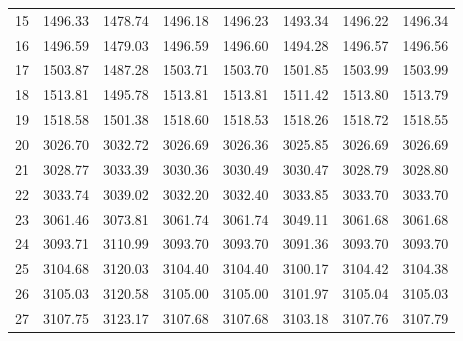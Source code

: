 \documentclass[10pt,oneside]{article}
\begin{document}
\begin{table}[h!]
\begin{tabular}{cccccccc}
15 &   1496.33 & 1478.74 & 1496.18 &    1496.23 &      1493.34 & 1496.22 &   1496.34 \\
16 &   1496.59 & 1479.03 & 1496.59 &    1496.60 &      1494.28 & 1496.57 &   1496.56 \\
17 &   1503.87 & 1487.28 & 1503.71 &    1503.70 &      1501.85 & 1503.99 &   1503.99 \\
18 &   1513.81 & 1495.78 & 1513.81 &    1513.81 &      1511.42 & 1513.80 &   1513.79 \\
19 &   1518.58 & 1501.38 & 1518.60 &    1518.53 &      1518.26 & 1518.72 &   1518.55 \\
20 &   3026.70 & 3032.72 & 3026.69 &    3026.36 &      3025.85 & 3026.69 &   3026.69 \\
21 &   3028.77 & 3033.39 & 3030.36 &    3030.49 &      3030.47 & 3028.79 &   3028.80 \\
22 &   3033.74 & 3039.02 & 3032.20 &    3032.40 &      3033.85 & 3033.70 &   3033.70 \\
23 &   3061.46 & 3073.81 & 3061.74 &    3061.74 &      3049.11 & 3061.68 &   3061.68 \\
24 &   3093.71 & 3110.99 & 3093.70 &    3093.70 &      3091.36 & 3093.70 &   3093.70 \\
25 &   3104.68 & 3120.03 & 3104.40 &    3104.40 &      3100.17 & 3104.42 &   3104.38 \\
26 &   3105.03 & 3120.58 & 3105.00 &    3105.00 &      3101.97 & 3105.04 &   3105.03 \\
27 &   3107.75 & 3123.17 & 3107.68 &    3107.68 &      3103.18 & 3107.76 &   3107.79 \\
\bottomrule
\end{tabular}
\end{table}
\end{document}
